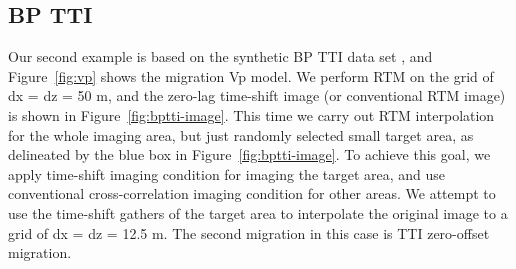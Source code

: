 
\subsection{BP TTI}

Our second example is based on the synthetic BP TTI data set \cite[]{shah07}, and Figure~\ref{fig:vp} shows the migration Vp model.
We perform   RTM \cite[]{fomel13,sun16} on the grid of dx = dz = 50 m, 
and the zero-lag time-shift image (or conventional RTM image)  is shown in Figure~\ref{fig:bptti-image}.
This time we   carry out RTM interpolation for the whole imaging area,
but just   randomly selected small target area, as delineated by the blue box in Figure~\ref{fig:bptti-image}.
To achieve this goal, we apply time-shift imaging condition for imaging the target area, 
and use conventional cross-correlation imaging condition for other areas.
We attempt to use the time-shift gathers of the target area to interpolate the original image to a grid of dx = dz = 12.5 m.
The second migration in this case is TTI zero-offset migration.


